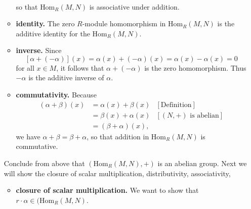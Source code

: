 \documentclass[9pt]{article}
\begin{document}
\begin{enumerate}
\begin{itemize}
\begin{align*}
               \end{align*}
               so that $\text{Hom}_R(M, N)$ is associative under addition.
         \item \textbf{identity.} The zero $R$-module homomorphism in
               $\text{Hom}_R(M, N)$ is the additive identity for the
               $\text{Hom}_R(M, N)$.
         \item \textbf{inverse.} Since
               $$[\alpha + (-\alpha)](x) = \alpha(x) + (-\alpha)(x) =
                 \alpha(x) - \alpha(x) = 0$$
               for all $x \in M$, it follows that $\alpha + (-\alpha)$ is the
               zero homomorphism. Thus $-\alpha$ is the additive inverse of
               $\alpha$.
         \item \textbf{commutativity.} Because
               \begin{align*}
                  (\alpha+\beta)(x) &= \alpha(x) + \beta(x)
                     &[\text{Definition}] \\
                     &= \beta(x) + \alpha(x) &[(N, +) \text{ is abelian}] \\
                     &= (\beta+\alpha)(x),
               \end{align*}
               we have $\alpha + \beta = \beta + \alpha$, so that addition in
               $\text{Hom}_R(M, N)$ is commutative.
      \end{itemize}
      Conclude from above that $(\text{Hom}_R(M, N), +)$ is an abelian group.
      Next we will show the closure of scalar multiplication, distributivity,
      associativity,
      \begin{itemize}
         \item \textbf{closure of scalar multiplication.} We want to show that
               $r \cdot \alpha \in (\text{Hom}_R(M, N)$.
      \end{itemize}
\end{enumerate}
\end{document}
